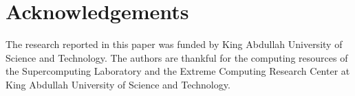 \documentclass[review,times,sort&compress]{elsarticle}
\begin{document}
%

\section*{Acknowledgements}
The research reported in this paper was funded by King Abdullah University of Science and Technology.
The authors are thankful for the computing resources of the Supercomputing Laboratory and the Extreme Computing Research Center at King Abdullah University of Science and Technology. 
%


\end{document}
